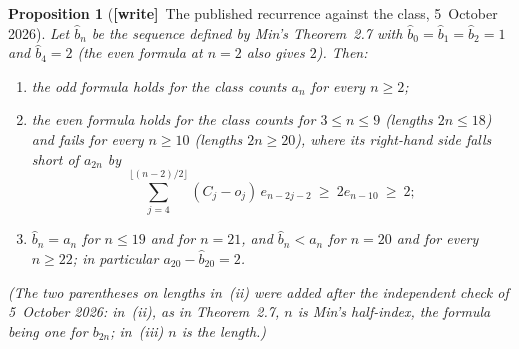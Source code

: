 \documentclass[11pt,letterpaper]{article}
\numberwithin{equation}{section}
\newtheorem{proposition}[theorem]{Proposition}
\theoremstyle{remark}\newtheorem{remark}[theorem]{Remark}
\newcommand{\wtag}{\textup{\textbf{[write]}}}
\begin{document}
\begin{proposition}[\wtag\ The published recurrence against the class, 5~October 2026]\label{abx:prop:hat}
Let $\hat b_n$ be the sequence defined by Min's Theorem~2.7 with $\hat b_0=\hat b_1=\hat b_2=1$ and $\hat b_4=2$ (the even formula at $n=2$ also gives $2$). Then:
\begin{enumerate}[label=\textup{(\roman*)}]
\item the odd formula holds for the class counts $a_n$ for every $n\ge2$;
\item the even formula holds for the class counts for $3\le n\le9$ (lengths $2n\le18$) and fails for every $n\ge10$ (lengths $2n\ge20$), where its right-hand side falls short of $a_{2n}$ by
\[
 \sum_{j=4}^{\lfloor(n-2)/2\rfloor}(C_j-o_j)\,e_{n-2j-2}\ \ge\ 2e_{n-10}\ \ge\ 2;
\]
\item $\hat b_n=a_n$ for $n\le19$ and for $n=21$, and $\hat b_n<a_n$ for $n=20$ and for every $n\ge22$; in particular $a_{20}-\hat b_{20}=2$.
\end{enumerate}
\textup{(The two parentheses on lengths in~(ii) were added after the independent check of 5~October 2026: in~(ii), as in Theorem~2.7, $n$ is Min's half-index, the formula being one for $b_{2n}$; in~(iii) $n$ is the length.)}
\end{proposition}
\end{document}
